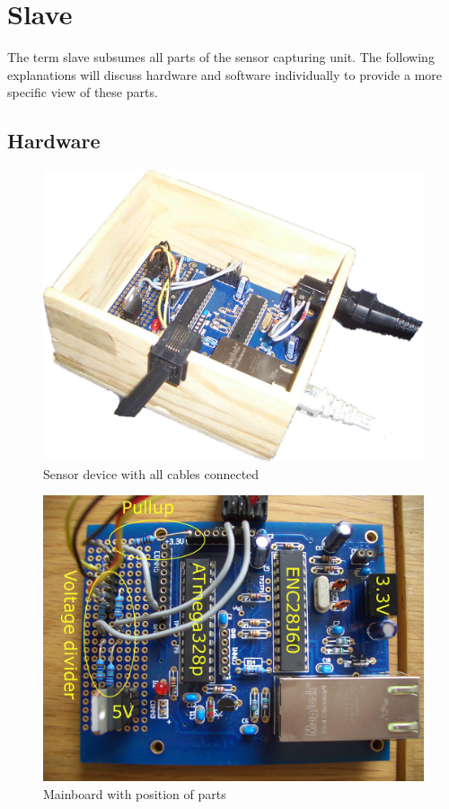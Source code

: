 
\chapter{Slave}

The term slave subsumes all parts of the sensor capturing unit.
The following explanations will discuss hardware and software individually to provide a more specific view of these parts.

\section{Hardware}

\begin{figure}[ht]
    \centering
    \includegraphics[width=0.6\linewidth]{graphics/sensordevice.jpg}
    \caption{Sensor device with all cables connected}
    \label{fig:sensordevice}
\end{figure}

\begin{figure}[ht]
    \centering
    \includegraphics[width=0.6\linewidth]{graphics/mainboard.jpg}
    \caption{Mainboard with position of parts}
    \label{fig:mainboard}
\end{figure}


